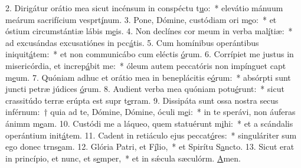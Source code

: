 2. Dirigátur orátio mea sicut incénsum in conspéctu t\uline{u}o:~* elevátio mánuum meárum sacrifícium vesprt\uline{í}num.
3. Pone, Dómine, custódiam ori m\uline{e}o:~* et óstium circumstántiæ lábis m\uline{e}is.
4. Non declínes cor meum in verba mal\uline{í}tiæ:~* ad excusándas excusatiónes in pcc\uline{á}tis.
5. Cum homínibus operántibus iniquit\uline{á}tem:~* et non communicábo cum eléctis \uline{ó}rum.
6. Corrípiet me justus in misericórdia, et increp\uline{á}bit me:~* óleum autem peccatóris non impínguet capt m\uline{e}um.
7. Quóniam adhuc et orátio mea in beneplácitis e\uline{ó}rum:~* absórpti sunt juncti petræ júdices \uline{ó}rum.
8. Audient verba mea quóniam potu\uline{é}runt:~* sicut crassitúdo terræ erúpta est supr t\uline{e}rram.
9. Dissipáta sunt ossa nostra secus inférnum:~† quia ad te, Dómine, Dómine, óculi m\uline{e}i:~* in te sperávi, non áuferas ánimm m\uline{e}am.
10. Custódi me a láqueo, quem statuérunt m\uline{i}hi:~* et a scándalis operántium init\uline{á}tem.
11. Cadent in retiáculo ejus peccat\uline{ó}res:~* singuláriter sum ego donec trns\uline{e}am.
12. Glória Patri, et F\uline{í}lio,~* et Spirítu S\uline{a}ncto.
13. Sicut erat in princípio, et nunc, et s\uline{e}mper,~* et in sǽcula sæculórm. \uline{A}men.
